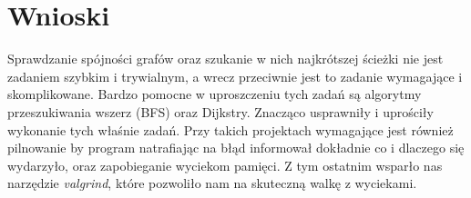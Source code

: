 \documentclass[10pt, a4paper]{report}
\begin{document}
    \section{Wnioski}
    Sprawdzanie spójności grafów oraz szukanie w nich najkrótszej ścieżki nie jest zadaniem szybkim i trywialnym, a wrecz przeciwnie jest to zadanie wymagające i skomplikowane.
    Bardzo pomocne w uproszczeniu tych zadań są algorytmy przeszukiwania wszerz (BFS) oraz Dijkstry. Znacząco usprawniły i uprościły wykonanie tych właśnie zadań.
    Przy takich projektach wymagające jest również pilnowanie by program natrafiając na błąd informował dokładnie co i dlaczego się wydarzyło, oraz zapobieganie wyciekom pamięci.
    Z tym ostatnim wsparło nas narzędzie \textit{valgrind}, które pozwoliło nam na skuteczną walkę z wyciekami.
\end{document}
